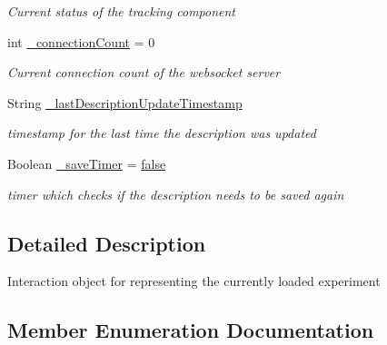 \begin{DoxyCompactItemize}
\begin{DoxyCompactList}\small\item\em Current status of the tracking component \end{DoxyCompactList}\item 
int \hyperlink{class_web_analyzer_1_1_u_i_1_1_interaction_objects_1_1_experiment_object_a1f1e01810382952ce7e524f55f8cbdd7}{\+\_\+connection\+Count} = 0
\begin{DoxyCompactList}\small\item\em Current connection count of the websocket server \end{DoxyCompactList}\item 
String \hyperlink{class_web_analyzer_1_1_u_i_1_1_interaction_objects_1_1_experiment_object_a418d4528d3345bae640856dcc7f0a5cf}{\+\_\+last\+Description\+Update\+Timestamp}
\begin{DoxyCompactList}\small\item\em timestamp for the last time the description was updated \end{DoxyCompactList}\item 
Boolean \hyperlink{class_web_analyzer_1_1_u_i_1_1_interaction_objects_1_1_experiment_object_af0ee137f0a5059a82a2b5ce160ec29d6}{\+\_\+save\+Timer} = \hyperlink{_u_i_2_h_t_m_l_resources_2js_2src_2export_8js_ae6c865df784842196d411c1466b01686}{false}
\begin{DoxyCompactList}\small\item\em timer which checks if the description needs to be saved again \end{DoxyCompactList}\end{DoxyCompactItemize}


\subsection{Detailed Description}
Interaction object for representing the currently loaded experiment 



\subsection{Member Enumeration Documentation}
\hypertarget{class_web_analyzer_1_1_u_i_1_1_interaction_objects_1_1_experiment_object_a2875208b4f4b0ed643593152f4ec025c}{}
